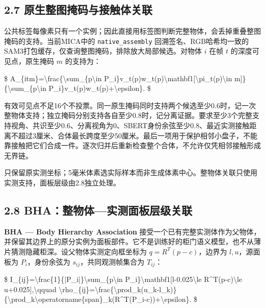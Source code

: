 \documentclass[UTF8,fontset=fandol]{ctexart}
\begin{document}
\subsection*{2.7 原生整图掩码与接触体关联}

公共标签每像素只有一个实例；因此直接用标签图判断完整物体，会丢掉重叠整图掩码的支持。当前MICA中的 \texttt{native\_\allowbreak{}assembly} 回溯签名、RGB哈希均一致的SAM3打包缓存，仅查询整图掩码，排除放大局部候选。对物体 $i$ 在帧 $t$ 的深度可见点，原生掩码 $m$ 的支持为：



\$
A\_\{itm\}=\textbackslash{}frac\{\textbackslash{}sum\_\{p\textbackslash{}in P\_i\}v\_t(p)w\_t(p)\textbackslash{}mathbf1[\textbackslash{}pi\_t(p)\textbackslash{}in m]\}\{\textbackslash{}sum\_\{p\textbackslash{}in P\_i\}v\_t(p)w\_t(p)+\textbackslash{}epsilon\}.
\$



有效可见点不足16个不投票。同一原生掩码同时支持两个候选至少0.6时，记一次整物体支持；独立掩码分别支持各自至少0.8时，记分离证据。要求至少3个完整支持视角、共识至少0.6、分离视角为0、SBERT身份余弦至少0.8、最近实测接触距离不超过3厘米、合体最长跨度至少50厘米。最后一项用于保护相邻小盘子，不能靠接触把它们合成一件。逐次归并后重新检查整个合体，不允许仅凭相邻接触形成无界链。



只保留原实测坐标；5毫米体素选实际样本而非生成体素中心。整物体关联只使用实测支持，面板层级由2.8独立处理。



\subsection*{2.8 BHA：整物体—实测面板层级关联}

\textbf{BHA — Body Hierarchy Association} 接受一个已有完整实测体作为父物体，并保留其边界上的原分实例为面板部件。它不是训练好的柜门语义模型，也不从薄片猜测隐藏柜深。设父物体实测定向框坐标为 $q=R^T(p-c)$，边界为 $l,u$，源面板为 $P_i$，身份余弦为 $s_{ij}$，共同观测帧集合为 $T_{ij}$：



\$
I\_\{ij\}=\textbackslash{}frac\{1\}\{|P\_i|\}\textbackslash{}sum\_\{p\textbackslash{}in P\_i\}\textbackslash{}mathbf1[l-0.025\textbackslash{}le R\textasciicircum{}T(p-c)\textbackslash{}le u+0.025],\textbackslash{}qquad
\textbackslash{}rho\_\{ij\}=\textbackslash{}frac\{\textbackslash{}prod\_k(u\_k-l\_k)\}\{\textbackslash{}prod\_k\textbackslash{}operatorname\{span\}\_k(R\textasciicircum{}T(P\_i-c))+\textbackslash{}epsilon\}.
\$
\end{document}
